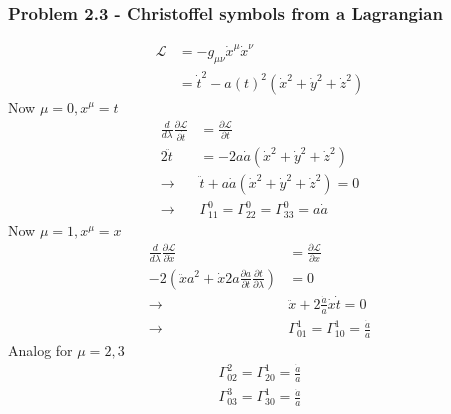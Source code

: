 \documentclass[10pt,a4paper]{book}
\theoremstyle{definition}
\begin{document}
\subsubsection{Problem 2.3 - Christoffel symbols from a Lagrangian}
\begin{align}
\mathcal{L}&=-g_{\mu\nu}\dot{x}^\mu\dot{x}^\nu\\
&=\dot{t}^2-a(t)^2(\dot{x}^2+\dot{y}^2+\dot{z}^2)
\end{align}
Now $\mu=0, x^\mu=t$
\begin{align}
\frac{d}{d\lambda}\frac{\partial\mathcal{L}}{\partial \dot{t}}&=\frac{\partial\mathcal{L}}{\partial t}\\
2\ddot{t}&=-2a\dot{a}(\dot{x}^2+\dot{y}^2+\dot{z}^2)\\
\rightarrow&\ddot{t}+a\dot{a}(\dot{x}^2+\dot{y}^2+\dot{z}^2)=0\\
\rightarrow&\Gamma^0_{11}=\Gamma^0_{22}=\Gamma^0_{33}=a\dot{a}
\end{align}
Now $\mu=1, x^\mu=x$
\begin{align}
\frac{d}{d\lambda}\frac{\partial\mathcal{L}}{\partial \dot{x}}&=\frac{\partial\mathcal{L}}{\partial x}\\
-2\left(\ddot{x}a^2+\dot{x}2a\frac{\partial a}{\partial t}\frac{\partial t}{\partial\lambda}\right)&=0\\
\rightarrow&\ddot{x}+2\frac{\dot{a}}{a}\dot{x}\dot{t}=0\\
\rightarrow&\Gamma^1_{01}=\Gamma^1_{10}=\frac{\dot{a}}{a}
\end{align}
Analog for $\mu=2,3$
\begin{align}
\Gamma^2_{02}=\Gamma^1_{20}=\frac{\dot{a}}{a}\\
\Gamma^3_{03}=\Gamma^1_{30}=\frac{\dot{a}}{a}
\end{align}
\end{document}

